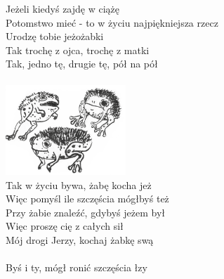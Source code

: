 \documentclass[a5paper, 10pt]{book}
\begin{document}
\begin{minipage}[t]{0.8\textwidth}
  \hspace*{5mm}Jeżeli kiedyś zajdę w ciążę \\
  \hspace*{5mm}Potomstwo mieć - to w życiu najpiękniejsza rzecz\\
  \hspace*{5mm}Urodzę tobie jeżożabki\\
  \hspace*{5mm}Tak trochę z ojca, trochę z matki\\
  \hspace*{5mm}Tak, jedno tę, drugie tę, pół na pół\\
  \\
  \includegraphics[height=3.4cm, right]{images/jezozabki.png}\vspace*{-3.4cm}\\
  Tak w życiu bywa, żabę kocha jeż\\
  Więc pomyśl ile szczęścia mógłbyś też\\
  Przy żabie znaleźć, gdybyś jeżem był\\
  Więc proszę cię z całych sił\\
  Mój drogi Jerzy, kochaj żabkę swą\\
  \\
  Byś i ty, mógł ronić szczęścia łzy\\
\end{minipage}
\end{document}
